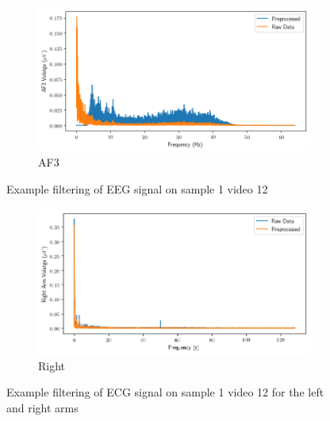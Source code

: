 \begin{figure}[h]
    \centering
    \begin{subfigure}[t]{\columnwidth}
        \centering
        \includegraphics[width=\columnwidth]{tex/figures/filtering/AF3.png}
        \caption{AF3}
        \label{fig:filter:af3}
    \end{subfigure}
    \caption{Example filtering of EEG signal on sample 1 video 12}
    \label{fig:eeg}
\end{figure}
\begin{figure}[h]
    \begin{subfigure}[t]{\columnwidth}
        \centering
        \includegraphics[width=\columnwidth]{tex/figures/filtering/ECG Right Arm.png}
        \caption{Right}
        \label{fig:filter:right}
    \end{subfigure}
    \caption{Example filtering of ECG signal on sample 1 video 12
             for the left and right arms}
    \label{fig:ecg}
\end{figure}
